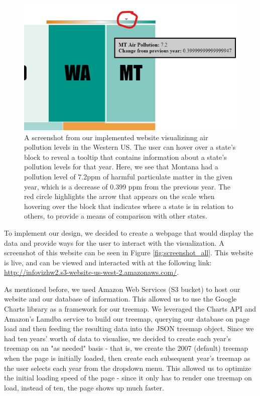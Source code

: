 \documentclass[journal]{vgtc}                %
\begin{document}
\begin{figure}
   \includegraphics[width=\columnwidth]{screenshot_hover.jpg}
   \caption{A screenshot from our implemented website visualizinng air pollution levels in the Western US. The user can hover over a state's block
   to reveal a tooltip that contains information about a state's pollution levels for that year. Here, we see that Montana had a pollution level of
   7.2ppm of harmful particulate matter in the given year, which is a decrease of 0.399 ppm from the previous year. The red circle highlights the arrow
   that appears on the scale when hovering over the block that indicates where a state is in relation to others, to provide a means of comparison 
   with other states.\label{fig:screenshot_hover}}
\end{figure}


To implement our design, we decided to create a webpage that would display the data and provide ways for the user to
interact with the visualization. A screenshot of this website can be seen in Figure \ref{fig:screenshot_all}.
This website is live, and can be viewed and interacted with at the following link:
\url{http://infovizhw2.s3-website-us-west-2.amazonaws.com/}.

As mentioned before, we used Amazon Web Services (S3 bucket) to host our website and our database of information. This allowed us to
use the Google Charts library as a framework for our treemap. We leveraged the Charts API and Amazon's Lamdba service to build our treemap, querying our
database on page load and then feeding the resulting data into the JSON treemap object. Since we had ten years' worth of data to
visualise, we decided to create each year's treemap on an "as needed" basis - that is, we create the 2007 (default) treemap when the
page is initially loaded, then create each subsequent year's treemap as the user selects each year from the dropdown menu.
This allowed us to optimize the initial loading speed of the page - since it only has to render one treemap on load, instead of
ten, the page shows up much faster.
\end{document}
